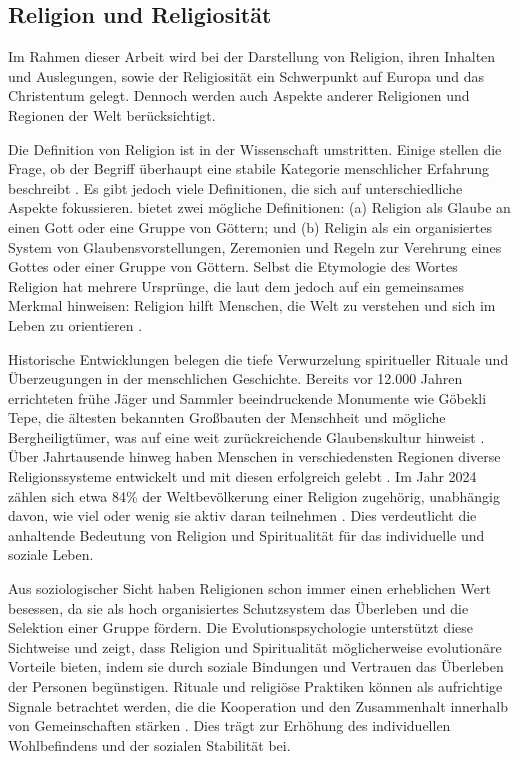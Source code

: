 \subsection{Religion und Religiosität}    \label{subsec_2.1.1}
Im Rahmen dieser Arbeit wird bei der Darstellung von Religion, ihren Inhalten und Auslegungen, sowie der Religiosität ein Schwerpunkt auf Europa und das Christentum gelegt. Dennoch werden auch Aspekte anderer Religionen und Regionen der Welt berücksichtigt.

Die Definition von Religion ist in der Wissenschaft umstritten. Einige stellen die Frage, ob der Begriff überhaupt eine stabile Kategorie menschlicher Erfahrung beschreibt \parencite{Taxonimie, ReliBegriff}. Es gibt jedoch viele Definitionen, die sich auf unterschiedliche Aspekte fokussieren. \textcite{BritannicaDef} bietet zwei mögliche Definitionen: (a) Religion als Glaube an einen Gott oder eine Gruppe von Göttern; und (b) Religin als ein organisiertes System von Glaubensvorstellungen, Zeremonien und Regeln zur Verehrung eines Gottes oder einer Gruppe von Göttern. Selbst die Etymologie des Wortes Religion hat mehrere Ursprünge, die laut dem \textcite{OxfordDic} jedoch auf ein gemeinsames Merkmal hinweisen: Religion hilft Menschen, die Welt zu verstehen und sich im Leben zu orientieren \parencite{Reli}.

Historische Entwicklungen belegen die tiefe Verwurzelung spiritueller Rituale und Überzeugungen in der menschlichen Geschichte. Bereits vor 12.000 Jahren errichteten frühe Jäger und Sammler beeindruckende Monumente wie Göbekli Tepe, die ältesten bekannten Großbauten der Menschheit und mögliche Bergheiligtümer, was auf eine weit zurückreichende Glaubenskultur hinweist \parencite{Joseph2011}. Über Jahrtausende hinweg haben Menschen in verschiedensten Regionen diverse Religionssysteme entwickelt und mit diesen erfolgreich gelebt \parencite{OxfordDic}.
Im Jahr 2024 zählen sich etwa 84\% der Weltbevölkerung einer Religion zugehörig, unabhängig davon, wie viel oder wenig sie aktiv daran teilnehmen \parencite{WorldPopulationReview2024}. Dies verdeutlicht die anhaltende Bedeutung von Religion und Spiritualität für das individuelle und soziale Leben.

Aus soziologischer Sicht haben Religionen schon immer einen erheblichen Wert besessen, da sie als hoch organisiertes Schutzsystem das Überleben und die Selektion einer Gruppe fördern. Die Evolutionspsychologie unterstützt diese Sichtweise und zeigt, dass Religion und Spiritualität möglicherweise evolutionäre Vorteile bieten, indem sie durch soziale Bindungen und Vertrauen das Überleben der Personen begünstigen. Rituale und religiöse Praktiken können als aufrichtige Signale betrachtet werden, die die Kooperation und den Zusammenhalt innerhalb von Gemeinschaften stärken \parencite{NorenzayanShariff2008}. Dies trägt zur Erhöhung des individuellen Wohlbefindens und der sozialen Stabilität bei.

